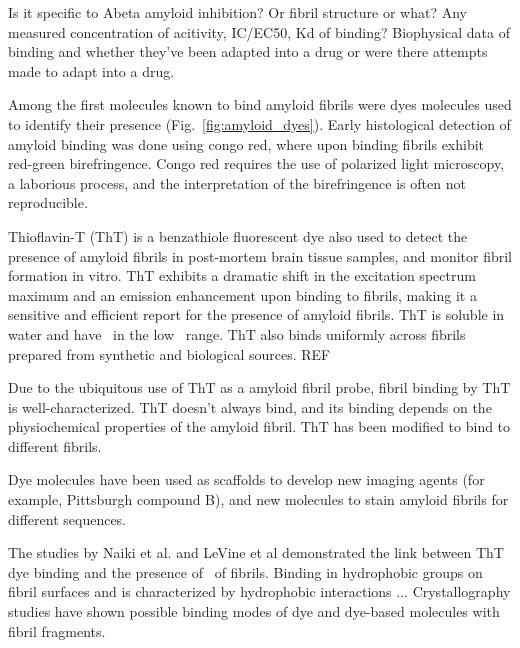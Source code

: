 Is it specific to Abeta amyloid inhibition? Or fibril structure or what? 
Any measured concentration of acitivity, IC/EC50, Kd of binding?
Biophysical data of binding and whether they've been adapted into a drug or were there attempts made to adapt into a drug.

Among the first molecules known to bind amyloid fibrils were dyes molecules used to identify their presence (Fig.~\ref{fig:amyloid_dyes}). Early histological detection of amyloid binding was done using congo red, where upon binding fibrils exhibit red-green birefringence. Congo red requires the use of polarized light microscopy, a laborious process, and the interpretation of the birefringence is often not reproducible.

Thioflavin-T (ThT) is a benzathiole fluorescent dye also used to detect the presence of amyloid fibrils in post-mortem brain tissue samples, and monitor fibril formation in vitro. ThT exhibits a dramatic shift in the excitation spectrum maximum and an emission enhancement upon binding to fibrils, making it a sensitive and efficient report for the presence of amyloid fibrils.  ThT is soluble in water and have \KD\ in the low \micromolar\ range.  ThT also binds uniformly across fibrils prepared from synthetic and biological sources.
REF

Due to the ubiquitous use of ThT as a amyloid fibril probe, fibril binding by ThT is well-characterized.  ThT doesn't always bind, and its binding depends on the physiochemical properties of the amyloid fibril.  ThT has been modified to bind to different fibrils.\cite{XXX}

Dye molecules have been used as scaffolds to develop new imaging agents (for example, Pittsburgh compound B), and new molecules to stain amyloid fibrils for different sequences. 


The studies by Naiki et al. and LeVine et al demonstrated the link between ThT dye binding and the presence of \crossbs\ of fibrils. Binding in hydrophobic groups on fibril surfaces and is characterized by hydrophobic interactions ...
Crystallography studies have shown possible binding modes of dye and dye-based molecules with fibril fragments.\cite{XXX}

